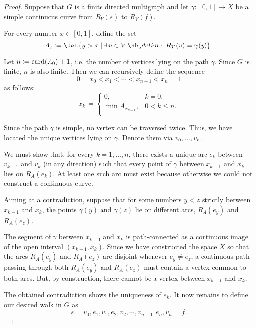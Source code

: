\begin{proof}
   Suppose that \( G \) is a finite directed multigraph and let \( \gamma: [0, 1] \to X \) be a simple continuous curve from \( R_V(s) \) to \( R_V(f) \).

  For every number \( x \in [0, 1] \), define the set
  \begin{equation*}
    A_x \coloneqq \set{ y > x \given \qexists* {v \in V} R_V(v) = \gamma(y) }.
  \end{equation*}

  Let \( n \coloneqq \operatorname{card}(A_0) + 1 \), i.e. the number of vertices lying on the path \( \gamma \). Since \( G \) is finite, \( n \) is also finite. Then we can recursively define the sequence
  \begin{equation*}
    0 = x_0 < x_1 < \cdots < x_{n-1} < x_n = 1
  \end{equation*}
  as follows:
  \begin{equation*}
    x_k \coloneqq \begin{cases}
      0,                &k = 0, \\
      \min A_{x_{k-1}}, &0 < k \leq n. \\
    \end{cases}
  \end{equation*}

  Since the path \( \gamma \) is simple, no vertex can be traversed twice. Thus, we have located the unique vertices lying on \( \gamma \). Denote them via \( v_0, \ldots, v_n \).

  We must show that, for every \( k = 1, \ldots, n \), there exists a unique arc \( e_k \) between \( v_{k-1} \) and \( v_k \) (in any direction) such that every point of \( \gamma \) between \( x_{k-1} \) and \( x_k \) lies on \( R_A(e_k) \). At least one such arc must exist because otherwise we could not construct a continuous curve.

  Aiming at a contradiction, suppose that for some numbers \( y < z \) strictly between \( x_{k-1} \) and \( x_k \), the points \( \gamma(y) \) and \( \gamma(z) \) lie on different arcs, \( R_A(e_y) \) and \( R_A(e_z) \).

  The segment of \( \gamma \) between \( x_{k-1} \) and \( x_k \) is path-connected as a continuous image of the open interval \( (x_{k-1}, x_k) \). Since we have constructed the space \( X \) so that the arcs \( R_A(e_y) \) and \( R_A(e_z) \) are disjoint whenever \( e_y \neq e_z \), a continuous path passing through both \( R_A(e_y) \) and \( R_A(e_z) \) must contain a vertex common to both arcs. But, by construction, there cannot be a vertex between \( x_{k-1} \) and \( x_k \).

  The obtained contradiction shows the uniqueness of \( e_k \). It now remains to define our desired walk in \( G \) as
  \begin{equation*}
    s = v_0, e_1, v_1, e_2, v_2, \cdots, v_{n-1}, e_n, v_n = f.
  \end{equation*}
\end{proof}

